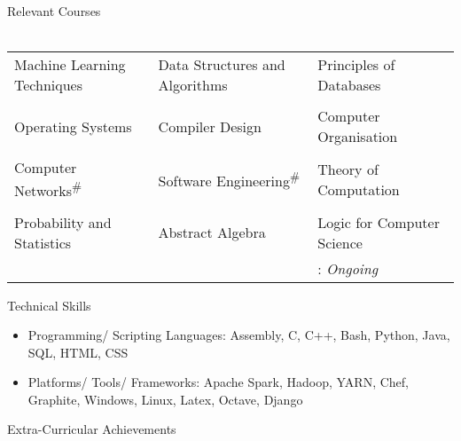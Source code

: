 \documentclass{article}
\begin{document}
{\Large Relevant Courses}\\\\
\begin{tabular}{p{6cm} p{6cm} p{6cm}}
Machine Learning Techniques & Data Structures and Algorithms & Principles of Databases\\\\\vspace{-0.4cm}Operating Systems &\vspace{-0.4cm} Compiler Design &\vspace{-0.4cm} Computer Organisation \\\\\vspace{-0.5cm}Computer Networks\textsuperscript{\#} & \vspace{-0.5cm}Software Engineering\textsuperscript{\#} & \vspace{-0.5cm}Theory of Computation\\\\
\vspace{-0.6cm}Probability and Statistics & \vspace{-0.6cm}Abstract Algebra & \vspace{-0.6cm}Logic for Computer Science\\ & & \vspace{-0.5cm}\hspace{3cm}{\#}: \emph{Ongoing}\\
\end{tabular}
{\Large Technical Skills}\\
\renewcommand{\labelitemi}{$\bullet$}
\begin{itemize}[leftmargin=0.82cm]
\item Programming/ Scripting Languages: Assembly, C, C++, Bash, Python, Java, SQL, HTML, CSS
\item Platforms/ Tools/ Frameworks: Apache Spark, Hadoop, YARN,  Chef, Graphite, Windows, Linux, Latex, Octave, Django
\end{itemize}
{\Large Extra-Curricular Achievements}
\newline
\newline
\end{document}
